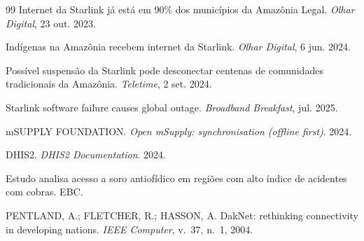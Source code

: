 \documentclass[a4paper,12pt]{article}
\begin{document}
\begin{thebibliography}{99}
 Internet da Starlink já está em 90\% dos municípios da
  Amazônia Legal. \textit{Olhar Digital}, 23 out. 2023.

 Indígenas na Amazônia recebem internet da Starlink.
  \textit{Olhar Digital}, 6 jun. 2024.

 Possível suspensão da Starlink pode desconectar
  centenas de comunidades tradicionais da Amazônia. \textit{Teletime}, 2 set. 2024.

 Starlink software failure causes global outage.
  \textit{Broadband Breakfast}, jul. 2025.

 mSUPPLY FOUNDATION. \textit{Open mSupply: synchronisation
  (offline first)}. 2024.

 DHIS2. \textit{DHIS2 Documentation}. 2024.

 Estudo analisa acesso a soro antiofídico em regiões
  com alto índice de acidentes com cobras. EBC.

 PENTLAND, A.; FLETCHER, R.; HASSON, A. DakNet:
  rethinking connectivity in developing nations. \textit{IEEE Computer},
  v.~37, n.~1, 2004.

\end{thebibliography}
\end{document}
